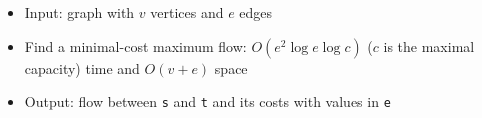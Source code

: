 \begin{itemize}
	\item Input: graph with $v$ vertices and $e$ edges
	\item Find a minimal-cost maximum flow: $O(e^2\log{e}\log{c})$ ($c$ is the maximal capacity) time and $O(v+e)$ space
	\item Output: flow between \lstinline{s} and \lstinline{t} and its costs with values in \lstinline{e}
\end{itemize}
